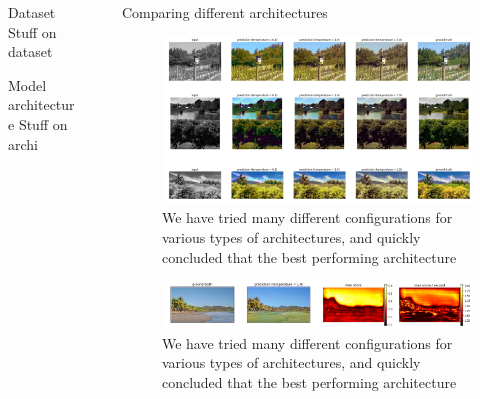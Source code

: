 \documentclass[final]{beamer}
\newlength{\sepwid}
\newlength{\onecolwid}
\newlength{\twocolwid}
\begin{document}
\begin{frame}[t]
\begin{columns}[t]
\begin{column}{\onecolwid}
\begin{block}{Dataset}
Stuff on dataset
\end{block}

\begin{block}{Model architecture}
Stuff on archi

\end{block}

\end{column} %




\begin{column}{\sepwid}\end{column} %


\begin{column}{\twocolwid} %

  \begin{block}{Comparing different architectures}

  \begin{figure}
  \begin{center}
  \includegraphics[width=.8\twocolwid]{img/good}
  \caption{We have tried many different configurations for various types of architectures, and quickly concluded that the best performing architecture}
  \label{good}
  \end{center}
  \end{figure}



  \begin{figure}
  \begin{center}
  \includegraphics[width=.8\twocolwid]{img/confidence}
  \caption{We have tried many different configurations for various types of architectures, and quickly concluded that the best performing architecture}
  \label{good}
  \end{center}
  \end{figure}



\end{block}
\end{column}
\end{columns}
\end{frame}
\end{document}
